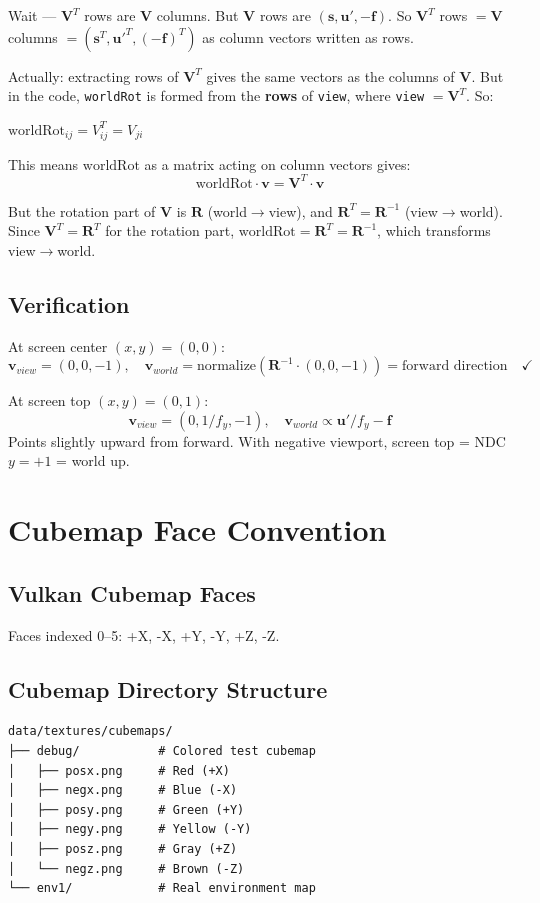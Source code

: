 \documentclass{article}
\begin{document}
Wait --- $\mathbf{V}^T$ rows are $\mathbf{V}$ columns. But $\mathbf{V}$ rows are $(\mathbf{s}, \mathbf{u'}, -\mathbf{f})$. So $\mathbf{V}^T$ rows $= \mathbf{V}$ columns $= (\mathbf{s}^T, \mathbf{u'}^T, (-\mathbf{f})^T)$ as column vectors written as rows.

Actually: extracting rows of $\mathbf{V}^T$ gives the same vectors as the columns of $\mathbf{V}$. But in the code, \texttt{worldRot} is formed from the \textbf{rows} of \texttt{view}, where \texttt{view} $= \mathbf{V}^T$. So:

$\text{worldRot}_{ij} = V^T_{ij} = V_{ji}$

This means $\text{worldRot}$ as a matrix acting on column vectors gives:
\[
\text{worldRot} \cdot \mathbf{v} = \mathbf{V}^T \cdot \mathbf{v}
\]

But the rotation part of $\mathbf{V}$ is $\mathbf{R}$ (world$\to$view), and $\mathbf{R}^T = \mathbf{R}^{-1}$ (view$\to$world). Since $\mathbf{V}^T = \mathbf{R}^T$ for the rotation part, $\text{worldRot} = \mathbf{R}^T = \mathbf{R}^{-1}$, which transforms view$\to$world. \checkmark

\subsection{Verification}
At screen center $(x, y) = (0, 0)$:
\[
\mathbf{v}_{view} = (0, 0, -1), \quad \mathbf{v}_{world} = \text{normalize}(\mathbf{R}^{-1} \cdot (0,0,-1)) = \text{forward direction} \quad \checkmark
\]

At screen top $(x, y) = (0, 1)$:
\[
\mathbf{v}_{view} = (0, 1/f_y, -1), \quad \mathbf{v}_{world} \propto \mathbf{u'}/f_y - \mathbf{f}
\]
Points slightly upward from forward. With negative viewport, screen top = NDC $y=+1$ = world up. \checkmark

\section{Cubemap Face Convention}

\subsection{Vulkan Cubemap Faces}
Faces indexed 0--5: +X, -X, +Y, -Y, +Z, -Z.

\subsection{Cubemap Directory Structure}
\begin{verbatim}
data/textures/cubemaps/
├── debug/           # Colored test cubemap
│   ├── posx.png     # Red (+X)
│   ├── negx.png     # Blue (-X)
│   ├── posy.png     # Green (+Y)
│   ├── negy.png     # Yellow (-Y)
│   ├── posz.png     # Gray (+Z)
│   └── negz.png     # Brown (-Z)
└── env1/            # Real environment map
\end{verbatim}
\end{document}
